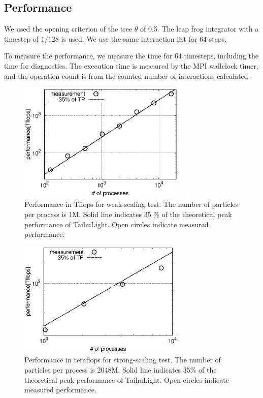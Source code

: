 \documentclass[oribibl]{llncs}
\begin{document}
\subsection{Performance}

We used the opening criterion of the tree $\theta$ of 0.5. The leap
frog integrator with a timestep of $1/128$ is used. We use the same
interaction list for 64 steps.

To measure the performance, we measure the time for 64 timesteps,
including the time for diagnostics. The execution time is measured by
the MPI wallclock timer, and the operation count is from the counted
number of interactions calculated.


\begin{figure}
  \centering
    \includegraphics[width=8cm,clip]{./fig/weak_speed.eps}
  \caption{Performance in Tflops for weak-scaling test. The number
    of particles per process is 1M. Solid line indicates 35 \% of the
    theoretical peak performance of TaihuLight. Open circles indicate
    measured performance.}
  \label{fig:weakpf}
\end{figure}

\begin{figure}
  \begin{center}
    \includegraphics[width=8cm,clip]{./fig/strong_speed.eps}
  \end{center}
  \caption{Performance in teraflops for strong-scaling test. The
    number of particles per process is 2048M. Solid line indicates 
	35\% of the theoretical peak performance of TaihuLight. Open circles
    indicate measured performance.}
  \label{fig:strongpf}
\end{figure}
\end{document}
